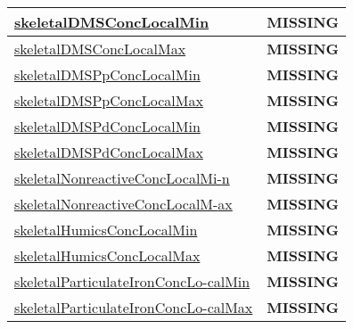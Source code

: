 {\begin{center}
\begin{longtable}{| p{2.0in} | p{4.0in} |}
    \hyperref[subsec:var_sec_tracer_monotonicity_skeletalDMSConcLocalMin]{skeletalDMSConcLocalMin} & {\bf \color{red} MISSING} \\
    \hline
    \hyperref[subsec:var_sec_tracer_monotonicity_skeletalDMSConcLocalMax]{skeletalDMSConcLocalMax} & {\bf \color{red} MISSING} \\
    \hline
    \hyperref[subsec:var_sec_tracer_monotonicity_skeletalDMSPpConcLocalMin]{skeletalDMSPpConcLocalMin} & {\bf \color{red} MISSING} \\
    \hline
    \hyperref[subsec:var_sec_tracer_monotonicity_skeletalDMSPpConcLocalMax]{skeletalDMSPpConcLocalMax} & {\bf \color{red} MISSING} \\
    \hline
    \hyperref[subsec:var_sec_tracer_monotonicity_skeletalDMSPdConcLocalMin]{skeletalDMSPdConcLocalMin} & {\bf \color{red} MISSING} \\
    \hline
    \hyperref[subsec:var_sec_tracer_monotonicity_skeletalDMSPdConcLocalMax]{skeletalDMSPdConcLocalMax} & {\bf \color{red} MISSING} \\
    \hline
    \hyperref[subsec:var_sec_tracer_monotonicity_skeletalNonreactiveConcLocalMin]{skeletalNonreactiveConcLocalMi-}\hyperref[subsec:var_sec_tracer_monotonicity_skeletalNonreactiveConcLocalMin]{n  }& {\bf \color{red} MISSING} \\
    \hline
    \hyperref[subsec:var_sec_tracer_monotonicity_skeletalNonreactiveConcLocalMax]{skeletalNonreactiveConcLocalM-}\hyperref[subsec:var_sec_tracer_monotonicity_skeletalNonreactiveConcLocalMax]{ax  }& {\bf \color{red} MISSING} \\
    \hline
    \hyperref[subsec:var_sec_tracer_monotonicity_skeletalHumicsConcLocalMin]{skeletalHumicsConcLocalMin} & {\bf \color{red} MISSING} \\
    \hline
    \hyperref[subsec:var_sec_tracer_monotonicity_skeletalHumicsConcLocalMax]{skeletalHumicsConcLocalMax} & {\bf \color{red} MISSING} \\
    \hline
    \hyperref[subsec:var_sec_tracer_monotonicity_skeletalParticulateIronConcLocalMin]{skeletalParticulateIronConcLo-}\hyperref[subsec:var_sec_tracer_monotonicity_skeletalParticulateIronConcLocalMin]{calMin  }& {\bf \color{red} MISSING} \\
    \hline
    \hyperref[subsec:var_sec_tracer_monotonicity_skeletalParticulateIronConcLocalMax]{skeletalParticulateIronConcLo-}\hyperref[subsec:var_sec_tracer_monotonicity_skeletalParticulateIronConcLocalMax]{calMax  }& {\bf \color{red} MISSING} \\

\end{longtable}
\end{center}}
